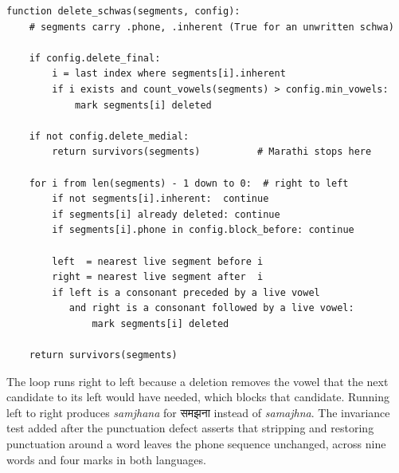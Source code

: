 \documentclass[12pt,a4paper]{article}
\DeclareRobustCommand{\dev}[1]{{\devfont #1}}
\begin{document}
\begin{Verbatim}[fontsize=\small,xleftmargin=1.5em]
function delete_schwas(segments, config):
    # segments carry .phone, .inherent (True for an unwritten schwa)

    if config.delete_final:
        i = last index where segments[i].inherent
        if i exists and count_vowels(segments) > config.min_vowels:
            mark segments[i] deleted

    if not config.delete_medial:
        return survivors(segments)          # Marathi stops here

    for i from len(segments) - 1 down to 0:  # right to left
        if not segments[i].inherent:  continue
        if segments[i] already deleted: continue
        if segments[i].phone in config.block_before: continue

        left  = nearest live segment before i
        right = nearest live segment after  i
        if left is a consonant preceded by a live vowel
           and right is a consonant followed by a live vowel:
               mark segments[i] deleted

    return survivors(segments)
\end{Verbatim}

The loop runs right to left because a deletion removes the vowel that the next candidate to its left would have needed, which blocks that candidate. Running left to right produces \textit{samjhana} for \dev{समझना} instead of \textit{samajhna}. The invariance test added after the punctuation defect asserts that stripping and restoring punctuation around a word leaves the phone sequence unchanged, across nine words and four marks in both languages.
\end{document}
